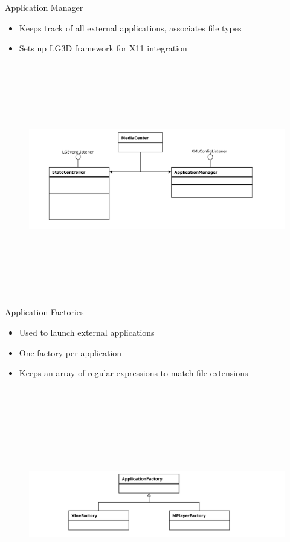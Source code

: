 \documentclass[style=smrt,mode=present,paper=screen]{powerdot}
\begin{document}
\begin{slide}{Application Manager}
\begin{itemize}
	\item Keeps track of all external applications, associates file types
	\item Sets up LG3D framework for X11 integration
\end{itemize}
\begin{figure}
\includegraphics[height=4in,angle=-90]{../lib/figures/MediaCenter-uml}
\end{figure}
\end{slide}

\begin{slide}{Application Factories}
\begin{itemize}
	\item Used to launch external applications
	\item One factory per application
	\item Keeps an array of regular expressions to match file extensions
\end{itemize}
\begin{figure}
\includegraphics[height=4in,angle=-90]{../lib/figures/ApplicationFactory-uml}
\end{figure}
\end{slide}
\end{document}
